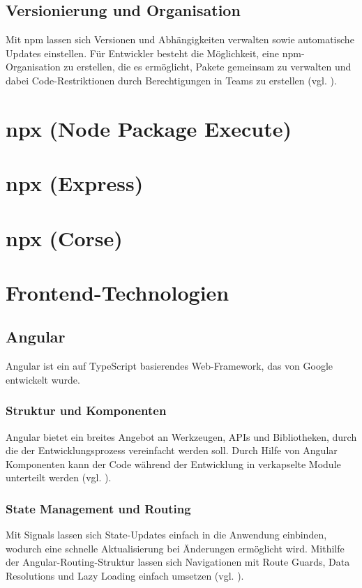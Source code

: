 \documentclass[oneside]{ausarbeitung}
\begin{document}
\subsection{Versionierung und Organisation}
Mit npm lassen sich Versionen und Abhängigkeiten verwalten sowie automatische Updates einstellen. Für Entwickler besteht die Möglichkeit, eine npm-Organisation zu erstellen, die es ermöglicht, Pakete gemeinsam zu verwalten und dabei Code-Restriktionen durch Berechtigungen in Teams zu erstellen (vgl. \parencite{npm}).

\section{npx (Node Package Execute)}
\section{npx (Express)}
\section{npx (Corse)}

\section{Frontend-Technologien}

\subsection{Angular}
Angular ist ein auf TypeScript basierendes Web-Framework, das von Google entwickelt wurde. 

\subsubsection{Struktur und Komponenten}
Angular bietet ein breites Angebot an Werkzeugen, APIs und Bibliotheken, durch die der Entwicklungsprozess vereinfacht werden soll. Durch Hilfe von Angular Komponenten kann der Code während der Entwicklung in verkapselte Module unterteilt werden (vgl. \parencite{angular}).

\subsubsection{State Management und Routing}
Mit Signals lassen sich State-Updates einfach in die Anwendung einbinden, wodurch eine schnelle Aktualisierung bei Änderungen ermöglicht wird. Mithilfe der Angular-Routing-Struktur lassen sich Navigationen mit Route Guards, Data Resolutions und Lazy Loading einfach umsetzen (vgl. \parencite{angular}).
\end{document}
